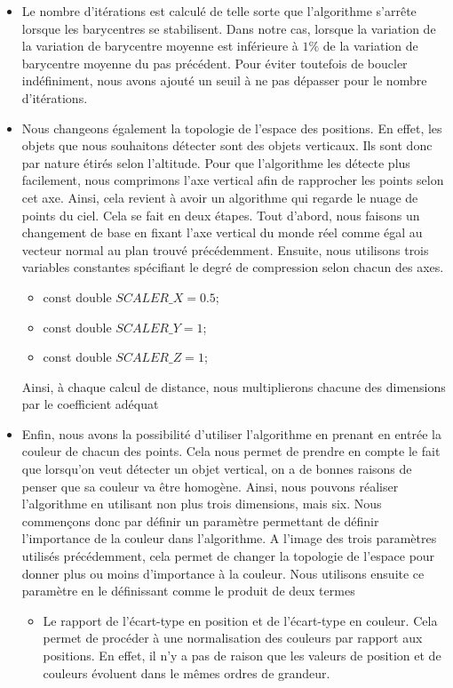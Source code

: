 \documentclass[titlepage,11pt,a4paper]{article}
\begin{document}
\begin{itemize}
\item{Le nombre d'itérations est calculé de telle sorte que l'algorithme s'arrête lorsque les barycentres se stabilisent. Dans notre cas, lorsque la variation de la variation de barycentre moyenne est inférieure à $1\%$  de la variation de barycentre moyenne du pas précédent. Pour éviter toutefois de boucler indéfiniment, nous avons ajouté un seuil à ne pas dépasser pour le nombre d'itérations.}
\item{Nous changeons également la topologie de l'espace des positions. En effet, les objets que nous souhaitons détecter sont des objets verticaux. Ils sont donc par nature étirés selon l'altitude. Pour que l'algorithme les détecte plus facilement, nous comprimons l'axe vertical afin de rapprocher les points selon cet axe. Ainsi, cela revient à avoir un algorithme qui regarde le nuage de points du ciel. Cela se fait en deux étapes. Tout d'abord, nous faisons un changement de base en fixant l'axe vertical du monde réel comme égal au vecteur normal au plan trouvé précédemment. Ensuite, nous utilisons trois variables constantes spécifiant le degré de compression selon chacun des axes.
\begin{itemize}
\item{const double $SCALER\_X = 0.5$;}
\item{const double $SCALER\_Y =1$;}
\item{const double $SCALER\_Z = 1$;}
\end{itemize}
Ainsi, à chaque calcul de distance, nous multiplierons chacune des dimensions par le coefficient adéquat}
\item{Enfin, nous avons la possibilité d'utiliser l'algorithme en prenant en entrée la couleur de chacun des points. Cela nous permet de prendre en compte le fait que lorsqu'on veut détecter un objet vertical, on a de bonnes raisons de penser que sa couleur va être homogène. Ainsi, nous pouvons réaliser l'algorithme en utilisant non plus trois dimensions, mais six. Nous commençons donc par définir un paramètre permettant de définir l'importance de la couleur dans l'algorithme. A l'image des trois paramètres utilisés précédemment, cela permet de changer la topologie de l'espace pour donner plus ou moins d'importance à la couleur. Nous utilisons ensuite ce paramètre en le définissant comme le produit de deux termes
\begin{itemize}
\item{Le rapport de l'écart-type en position et de l'écart-type en couleur. Cela permet de procéder à une normalisation des couleurs par rapport aux positions. En effet, il n'y a pas de raison que les valeurs de position et de couleurs évoluent dans le mêmes ordres de grandeur.}

\end{itemize}}
\end{itemize}
\end{document}
